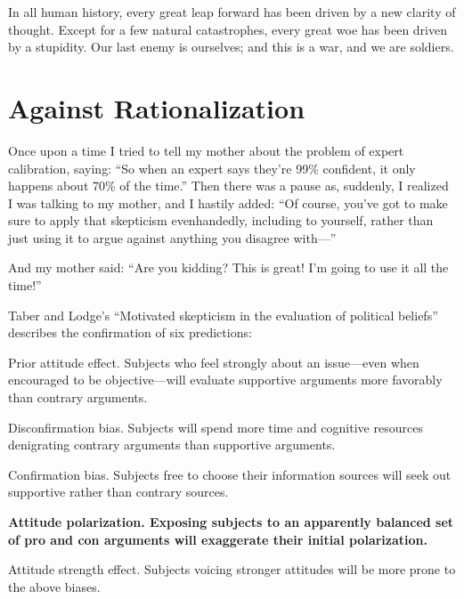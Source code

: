{
 In all human history, every great leap forward has been driven by
a new clarity of thought. Except for a few natural catastrophes, every
great woe has been driven by a stupidity. Our last enemy is ourselves;
and this is a war, and we are soldiers.}

\myendsectiontext


\bigskip


\chapter{Against Rationalization}


{
 Once upon a time I tried to tell my mother about the problem of
expert calibration, saying: ``So when an expert says
they're 99\% confident, it only happens about 70\% of
the time.'' Then there was a pause as, suddenly, I
realized I was talking to my mother, and I hastily added:
``Of course, you've got to make sure
to apply that skepticism evenhandedly, including to yourself, rather
than just using it to argue against anything you disagree
with---'' }

{
 And my mother said: ``Are you kidding? This is
great! I'm going to use it all the
time!''}

{
 Taber and Lodge's ``Motivated
skepticism in the evaluation of political beliefs''
describes the confirmation of six predictions:}

{
 Prior attitude effect. Subjects who feel strongly about an
issue---even when encouraged to be objective---will evaluate supportive
arguments more favorably than contrary arguments.}

{
 Disconfirmation bias. Subjects will spend more time and cognitive
resources denigrating contrary arguments than supportive arguments.}

{
 Confirmation bias. Subjects free to choose their information
sources will seek out supportive rather than contrary sources.}

{
 \textbf{Attitude polarization. Exposing subjects to an apparently
balanced set of pro and con arguments will exaggerate their initial
polarization.}}

{
 Attitude strength effect. Subjects voicing stronger attitudes will
be more prone to the above biases.}

